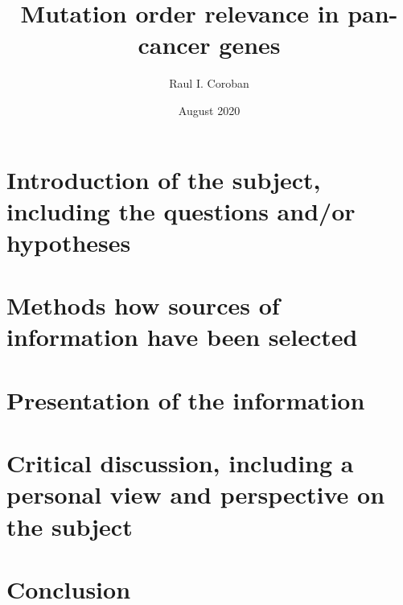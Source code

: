 \documentclass[a4paper]{article}
\title{Mutation order relevance in pan-cancer genes}
\author{Raul I. Coroban}
\date{August 2020}
\begin{document}
\maketitle

\begin{abstract}

\end{abstract}

\section{Introduction of the subject, including the questions and/or hypotheses}


\section{Methods how sources of information have been selected}


\section{Presentation of the information}


\section{Critical discussion, including a personal view and perspective on the subject}


\section{Conclusion}




\end{document}
